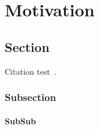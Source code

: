 
\chapter{Motivation}\label{chapter:motivation}

\section{Section}
Citation test~\parencite{latex}.

\subsection{Subsection}
\subsubsection{SubSub}



